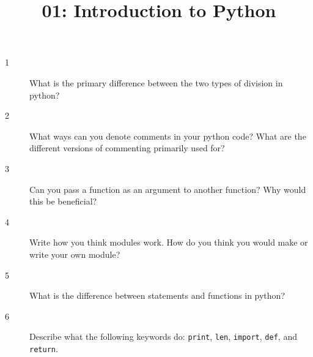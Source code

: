 \documentclass[10pt]{amsart}
\title{01: Introduction to Python}
\begin{document}
\maketitle

\begin{description}
\item[1] What is the primary difference between the two types of division in
python?
\vspace{0.75in}

\item[2] What ways can you denote comments in your python code? What are the
different versions of commenting primarily used for?
\vspace{0.75in}

\item[3] Can you pass a function as an argument to another function? Why
would this be beneficial?
\vspace{0.75in}

\item[4] Write how you think modules work. How do you think you would make or
write your own module?
\vspace{0.75in}

\item[5] What is the difference between statements and functions in python?
\vspace{0.75in}

\item[6] Describe what the following keywords do: \verb+print+, \verb+len+,
\verb+import+, \verb+def+, and \verb+return+.
\vspace{0.75in}
\end{description}
\end{document}
